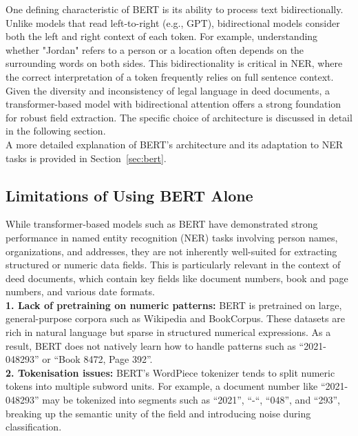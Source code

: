 \documentclass{article}
\begin{document}
One defining characteristic of BERT is its ability to process text bidirectionally. Unlike models that read left-to-right (e.g., GPT), bidirectional models consider both the left and right context of each token. For example, understanding whether "Jordan" refers to a person or a location often depends on the surrounding words on both sides. This bidirectionality is critical in NER, where the correct interpretation of a token frequently relies on full sentence context. \\

Given the diversity and inconsistency of legal language in deed documents, a transformer-based model with bidirectional attention offers a strong foundation for robust field extraction. The specific choice of architecture is discussed in detail in the following section. \\

A more detailed explanation of BERT's architecture and its adaptation to NER tasks is provided in Section~\ref{sec:bert}.

\subsection{Limitations of Using BERT Alone}

While transformer-based models such as BERT have demonstrated strong performance in named entity recognition (NER) tasks involving person names, organizations, and addresses, they are not inherently well-suited for extracting structured or numeric data fields. This is particularly relevant in the context of deed documents, which contain key fields like document numbers, book and page numbers, and various date formats. \\

\textbf{1. Lack of pretraining on numeric patterns:} BERT is pretrained on large, general-purpose corpora such as Wikipedia and BookCorpus. These datasets are rich in natural language but sparse in structured numerical expressions. As a result, BERT does not natively learn how to handle patterns such as ``2021-048293'' or ``Book 8472, Page 392''. \\

\textbf{2. Tokenisation issues:} BERT's WordPiece tokenizer tends to split numeric tokens into multiple subword units. For example, a document number like ``2021-048293'' may be tokenized into segments such as ``2021'', ``-``, ``048'', and ``293'', breaking up the semantic unity of the field and introducing noise during classification. \\
\end{document}
